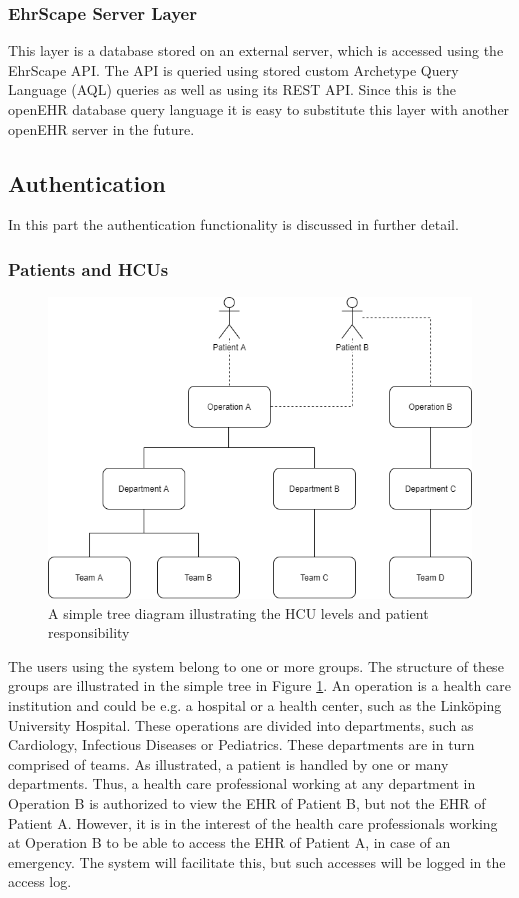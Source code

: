 \documentclass{article}
\begin{document}
\subsubsection{EhrScape Server Layer}
This layer is a database stored on an external server, which is accessed using the EhrScape API. The API is queried using stored custom Archetype Query Language (AQL) queries as well as using its REST API. Since this is the openEHR database query language it is easy to substitute this layer with another openEHR server in the future.


\subsection{Authentication} \label{Authentication}
In this part the authentication functionality is discussed in further detail.

\subsubsection{Patients and HCUs}
\begin{figure}[h]
    \centering
    \includegraphics[scale = 0.45]{departments}
    \caption{A simple tree diagram illustrating the HCU levels and patient responsibility}
    \label{fig:departments}
\end{figure}

The users using the system belong to one or more groups. The structure of these groups are illustrated in the simple tree in Figure \ref{fig:departments}. An operation is a health care institution and could be e.g. a hospital or a health center, such as the Linköping University Hospital. These operations are divided into departments, such as Cardiology,  Infectious Diseases or Pediatrics. These departments are in turn comprised of teams.  
As illustrated, a patient is handled by one or many departments. Thus, a health care professional working at any department in Operation B is authorized to view the EHR of Patient B, but not the EHR of Patient A.
However, it is in the interest of the health care professionals working at Operation B to be able to access the EHR of Patient A, in case of an emergency. The system will facilitate this, but such accesses will be logged in the access log.
\end{document}
